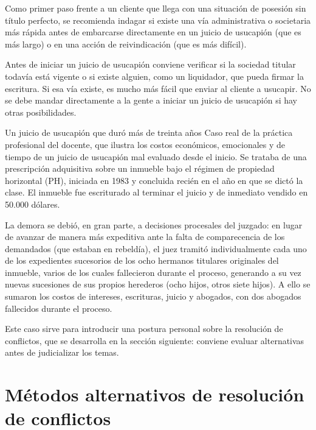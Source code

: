 \documentclass[12pt,oneside]{book}
\begin{document}
Como primer paso frente a un cliente que llega con una situación de posesión sin título perfecto, se recomienda indagar si existe una vía administrativa o societaria más rápida antes de embarcarse directamente en un juicio de usucapión (que es más largo) o en una acción de reivindicación (que es más difícil).

\begin{important}
Antes de iniciar un juicio de usucapión conviene verificar si la sociedad titular todavía está vigente o si existe alguien, como un liquidador, que pueda firmar la escritura. Si esa vía existe, es mucho más fácil que enviar al cliente a usucapir. No se debe mandar directamente a la gente a iniciar un juicio de usucapión si hay otras posibilidades.
\end{important}

\begin{example}{Un juicio de usucapión que duró más de treinta años}
Caso real de la práctica profesional del docente, que ilustra los costos económicos, emocionales y de tiempo de un juicio de usucapión mal evaluado desde el inicio. Se trataba de una prescripción adquisitiva sobre un inmueble bajo el régimen de propiedad horizontal (PH), iniciada en 1983 y concluida recién en el año en que se dictó la clase. El inmueble fue escriturado al terminar el juicio y de inmediato vendido en 50.000 dólares.

La demora se debió, en gran parte, a decisiones procesales del juzgado: en lugar de avanzar de manera más expeditiva ante la falta de comparecencia de los demandados (que estaban en rebeldía), el juez tramitó individualmente cada uno de los expedientes sucesorios de los ocho hermanos titulares originales del inmueble, varios de los cuales fallecieron durante el proceso, generando a su vez nuevas sucesiones de sus propios herederos (ocho hijos, otros siete hijos). A ello se sumaron los costos de intereses, escrituras, juicio y abogados, con dos abogados fallecidos durante el proceso.
\end{example}

Este caso sirve para introducir una postura personal sobre la resolución de conflictos, que se desarrolla en la sección siguiente: conviene evaluar alternativas antes de judicializar los temas.

\section{Métodos alternativos de resolución de conflictos}
\label{sec:mediacion}
\end{document}
